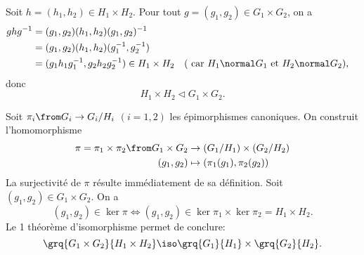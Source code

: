 Soit $h = (h_1,h_2)\in H_1\times H_2$. 
Pour tout $g = (g_1,g_2)\in G_1\times G_2$, on a
%
\begin{align*}
  ghg^{-1} 
    &= (g_1,g_2)(h_1,h_2)(g_1,g_2)^{-1} \\
    &= (g_1,g_2)(h_1,h_2)(g_1^{-1},g_2^{-1}) \\
    &= (g_1 h_1 g_1^{-1},g_2 h_2 g_2^{-1})\in H_1\times H_2
    && \text{( car $H_1\normal G_1$ et $H_2\normal G_2$)},
\end{align*}
%
donc 
\[
  H_1\times H_2\lhd G_1\times G_2.
\]

Soit $\pi_i\from G_i\to G_i/H_i$ $(i = 1,2)$ les épimorphismes canoniques. On
construit l'homomorphisme
%
\begin{align*}
  \pi=\pi_1\times\pi_2\from G_1\times G_2 &\to (G_1/H_1)\times(G_2/H_2)\\
  (g_1,g_2) &\mapsto (\pi_1(g_1),\pi_2(g_2))
\end{align*}
%
La surjectivité de $\pi$ résulte immédiatement de sa définition. Soit
$(g_1,g_2)\in G_1\times G_2$. On a 
\[
  (g_1,g_2)\in\ker\pi 
  \iff (g_1,g_2)\in\ker\pi_1\times\ker\pi_2 = H_1\times H_2.
\]
Le 1 théorème d'isomorphisme permet de conclure:
\[
  \grq{G_1\times G_2}{H_1\times H_2}\iso\grq{G_1}{H_1}\times\grq{G_2}{H_2}.
\]

